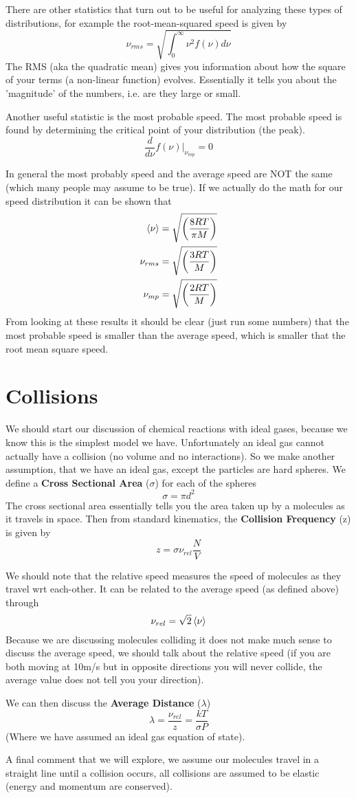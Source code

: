 \documentclass{article}
\newcommand{\be}{\begin{equation}}
\newcommand{\ee}{\end{equation}}
\begin{document}
There are other statistics that turn out to be useful for analyzing these types of distributions, for example the root-mean-squared speed is given by 
\be
\nu_{rms} = \sqrt{\int_0^\infty \nu^2 f(\nu) d\nu}
\ee
The RMS (aka the quadratic mean) gives you information about how the square of your terms (a non-linear function) evolves.
Essentially it tells you about the 'magnitude' of the numbers, i.e. are they large or small. 

Another useful statistic is the most probable speed. 
The most probable speed is found by determining the critical point of your distribution (the peak).
\be
\frac{d}{d\nu}f(\nu)|_{\nu_{mp}} = 0
\ee
 
In general the most probably speed and the average speed are NOT the same (which many people may assume to be true).
If we actually do the math for our speed distribution it can be shown that
\be
\begin{split}
\braket{\nu} &= \sqrt{\left(\frac{8RT}{\pi M}\right)} \\
\nu_{rms} &= \sqrt{\left(\frac{3RT}{ M}\right)} \\
\nu_{mp} &= \sqrt{\left(\frac{2RT}{ M}\right)}
\end{split}
\ee
From looking at these results it should be clear (just run some numbers) that the most probable speed is smaller than the average speed, which is smaller that the root mean square speed. 

\section*{Collisions}
We should start our discussion of chemical reactions with ideal gases, because we know this is the simplest model we have.
Unfortunately an ideal gas cannot actually have a collision (no volume and no interactions).
So we make another assumption, that we have an ideal gas, except the particles are hard spheres. 
We define a \textbf{Cross Sectional Area} ($\sigma$) for each of the spheres
\be
\sigma = \pi d^2
\ee
The cross sectional area essentially tells you the area taken up by a molecules as it travels in space. 
Then from standard kinematics, the \textbf{Collision Frequency} (z) is given by 
\be
z = \sigma \nu_{rel} \frac{N}{V}
\ee

We  should note  that the relative speed measures the speed of molecules as they travel wrt each-other. 
It can be related to the average speed (as defined above) through
\be
\nu_{rel} = \sqrt{2} \braket{\nu}
\ee
Because we are discussing molecules colliding it does not make much sense to discuss the average speed, we should talk about the relative speed (if you are both moving at 10m/s but in opposite directions you will never collide, the average value does not tell you your direction). 

We can then discuss the \textbf{Average Distance} ($\lambda$)
\be
\lambda = \frac{\nu_{rel}}{z} = \frac{kT}{\sigma P}
\ee
(Where we have assumed an ideal gas equation of state). 

A final comment that we will explore, we assume our molecules travel in a straight line until a collision occurs, all collisions are assumed to be elastic (energy and momentum are conserved). 
\end{document}
